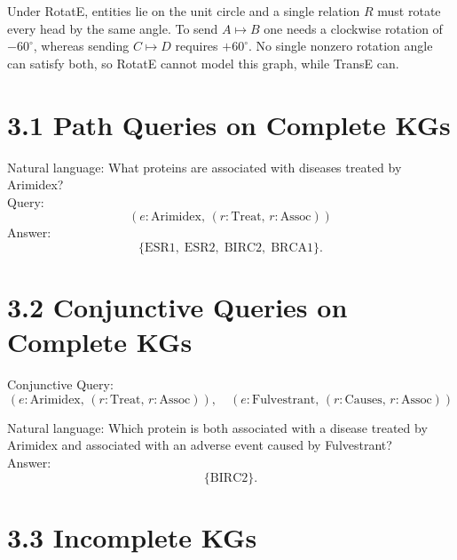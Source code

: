 \documentclass[a4paper,12pt]{article}
\begin{document}
Under RotatE, entities lie on the unit circle and a single relation \(R\) must rotate every head by the same angle.  To send \(A\mapsto B\) one needs a clockwise rotation of \(-60^\circ\), whereas sending \(C\mapsto D\) requires \(+60^\circ\).  No single nonzero rotation angle can satisfy both, so RotatE cannot model this graph, while TransE can.  


\section*{3.1 Path Queries on Complete KGs}

Natural language: What proteins are associated with diseases treated by Arimidex?\\

Query: 
\[
(e:\mathrm{Arimidex},\,(r:\mathrm{Treat},\,r:\mathrm{Assoc}))
\]
Answer:
\[
\{\mathrm{ESR1},\;\mathrm{ESR2},\;\mathrm{BIRC2},\;\mathrm{BRCA1}\}.
\]



\section*{3.2 Conjunctive Queries on Complete KGs}


Conjunctive Query:
\[
(e:\mathrm{Arimidex},\,(r:\mathrm{Treat},\,r:\mathrm{Assoc})),\quad
(e:\mathrm{Fulvestrant},\,(r:\mathrm{Causes},\,r:\mathrm{Assoc}))
\]

Natural language: Which protein is both associated with a disease treated by Arimidex and associated with an adverse event caused by Fulvestrant?\\


Answer:
\[
\{\mathrm{BIRC2}\}.
\]



\section*{3.3 Incomplete KGs}
\end{document}
